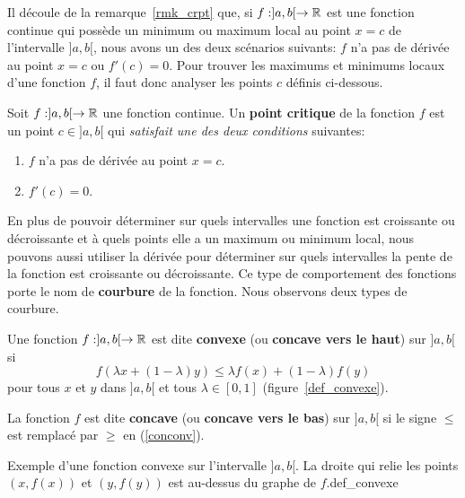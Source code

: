 {Il découle de la remarque~\ref{rmk_crpt} que, si $f:]a,b[\to \mathbb{R}$ est
une fonction continue qui possède un minimum ou maximum local au point
$x=c$ de l'intervalle $]a,b[$, nous avons un des deux scénarios suivants:
$f$ n'a pas de dérivée au point $x=c$ ou $f'(c) = 0$.  Pour trouver
les maximums et minimums locaux d'une fonction $f$, il faut donc
analyser les points $c$ définis ci-dessous.

\begin{defn} 
Soit $f:]a,b[ \to \mathbb{R}$ une fonction continue.
Un {\bfseries point critique} de la fonction $f$ est un point
$c \in ]a,b[$ qui {\em satisfait une des deux conditions} suivantes:
\begin{enumerate}
\item $f$ n'a pas de dérivée au point $x=c$.
\item $f'(c) = 0$.
\end{enumerate}
\end{defn}

En plus de pouvoir déterminer sur quels intervalles une fonction est
croissante ou décrois\-sante et à quels points elle a un maximum ou
minimum local, nous pouvons aussi utiliser la dérivée pour déterminer sur
quels intervalles la pente de la fonction est croissante ou
décroissante.  Ce type de comportement des fonctions porte le nom de
{\bfseries courbure} de la fonction.  Nous observons deux
types de courbure.

\begin{defn}
Une fonction $f:]a,b[\to \mathbb{R}$ est dite {\bfseries convexe} (ou
{\bfseries concave vers le haut}) sur $]a,b[$ si
\begin{equation} \label{conconv}
f(\lambda x + (1-\lambda)y) \leq \lambda f(x) + (1-\lambda)f(y)
\end{equation}
pour tous $x$ et $y$ dans $]a,b[$ et tous $\lambda \in [0,1]$
(figure~\ref{def_convexe}).
 

La fonction $f$ est dite {\bfseries concave} (ou
{\bfseries concave vers le bas}) sur $]a,b[$
si le signe $\leq$ est remplacé par $\geq$ en (\ref{conconv}).
 
\end{defn}

{Exemple d'une fonction convexe sur l'intervalle $]a,b[$.  La droite
qui relie les points $(x,f(x))$ et $(y,f(y))$ est au-dessus du
graphe de $f$.}{def_convexe}

}

